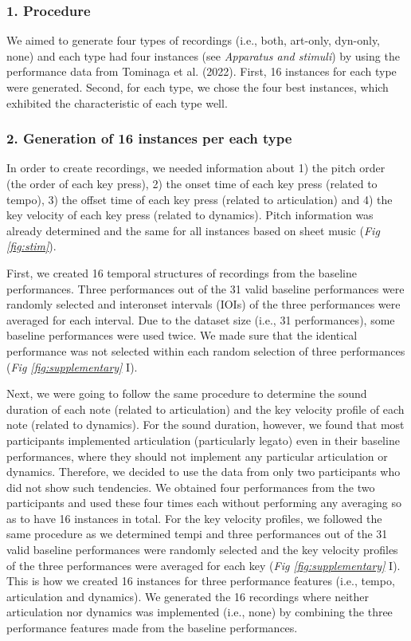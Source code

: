 \documentclass[
  man,floatsintext]{apa6}
\begin{document}
\hypertarget{procedure-1}{%
\subsubsection{1. Procedure}\label{procedure-1}}

We aimed to generate four types of recordings (i.e., both, art-only, dyn-only, none) and each type had four instances (see \emph{Apparatus and stimuli}) by using the performance data from Tominaga et al. (2022). First, 16 instances for each type were generated. Second, for each type, we chose the four best instances, which exhibited the characteristic of each type well.

\hypertarget{generation-of-16-instances-per-each-type}{%
\subsubsection{2. Generation of 16 instances per each type}\label{generation-of-16-instances-per-each-type}}

In order to create recordings, we needed information about 1) the pitch order (the order of each key press), 2) the onset time of each key press (related to tempo), 3) the offset time of each key press (related to articulation) and 4) the key velocity of each key press (related to dynamics). Pitch information was already determined and the same for all instances based on sheet music (\emph{Fig \ref{fig:stim}}).

First, we created 16 temporal structures of recordings from the baseline performances. Three performances out of the 31 valid baseline performances were randomly selected and interonset intervals (IOIs) of the three performances were averaged for each interval. Due to the dataset size (i.e., 31 performances), some baseline performances were used twice. We made sure that the identical performance was not selected within each random selection of three performances (\emph{Fig \ref{fig:supplementary}} I).

Next, we were going to follow the same procedure to determine the sound duration of each note (related to articulation) and the key velocity profile of each note (related to dynamics). For the sound duration, however, we found that most participants implemented articulation (particularly legato) even in their baseline performances, where they should not implement any particular articulation or dynamics. Therefore, we decided to use the data from only two participants who did not show such tendencies. We obtained four performances from the two participants and used these four times each without performing any averaging so as to have 16 instances in total. For the key velocity profiles, we followed the same procedure as we determined tempi and three performances out of the 31 valid baseline performances were randomly selected and the key velocity profiles of the three performances were averaged for each key (\emph{Fig \ref{fig:supplementary}} I). This is how we created 16 instances for three performance features (i.e., tempo, articulation and dynamics). We generated the 16 recordings where neither articulation nor dynamics was implemented (i.e., none) by combining the three performance features made from the baseline performances.
\end{document}
